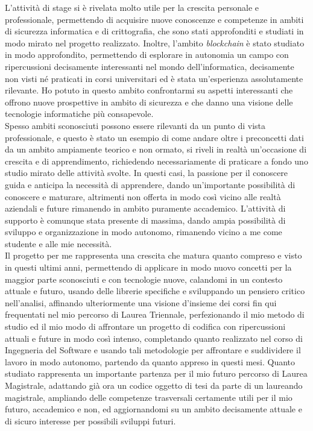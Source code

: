 L'attività di stage si è rivelata molto utile per la crescita personale e professionale, permettendo di acquisire nuove conoscenze
e competenze in ambiti di sicurezza informatica e di crittografia, che sono stati approfonditi e studiati in modo mirato nel progetto realizzato.
Inoltre, l'ambito \textit{blockchain} è stato studiato in modo approfondito, permettendo di esplorare in autonomia un campo con ripercussioni
decisamente interessanti nel mondo dell'informatica, decisamente non visti né praticati in corsi universitari ed è stata un'esperienza assolutamente rilevante. 
Ho potuto in questo ambito confrontarmi su aspetti interessanti che offrono nuove prospettive in ambito di sicurezza e che danno una visione delle tecnologie informatiche più consapevole. \\

Spesso ambiti sconosciuti possono essere rilevanti da un punto di vista professionale, e questo è stato un esempio di come
andare oltre i preconcetti dati da un ambito ampiamente teorico e non ormato, si riveli in realtà un'occasione di crescita
e di apprendimento, richiedendo necessariamente di praticare a fondo uno studio mirato delle attività svolte. 
In questi casi, la passione per il conoscere guida e anticipa la necessità di apprendere, dando un'importante possibilità di conoscere e maturare,
altrimenti non offerta in modo così vicino alle realtà aziendali e future rimanendo in ambito puramente accademico.
L'attività di supporto è comunque stata presente di massima, dando ampia possibilità di sviluppo e organizzazione in modo autonomo, 
rimanendo vicino a me come studente e alle mie necessità. \\

Il progetto per me rappresenta una crescita che matura quanto compreso e visto in questi ultimi anni, permettendo di applicare in modo nuovo 
concetti per la maggior parte sconosciuti e con tecnologie nuove, calandomi in un contesto attuale e futuro, usando delle librerie specifiche e sviluppando un
pensiero critico nell'analisi, affinando ulteriormente una visione d'insieme dei corsi fin qui frequentati nel mio percorso di Laurea Triennale, perfezionando il mio metodo di studio 
ed il mio modo di affrontare un progetto di codifica con ripercussioni attuali e future in modo così intenso, completando quanto realizzato nel corso di Ingegneria del Software
e usando tali metodologie per affrontare e suddividere il lavoro in modo autonomo, partendo da quanto appreso in questi mesi.
Quanto studiato rappresenta un importante partenza per il mio futuro percorso di Laurea Magistrale, adattando già ora un codice oggetto di tesi da parte di un laureando magistrale,
ampliando delle competenze trasversali certamente utili per il mio futuro, accademico e non, ed aggiornandomi su un ambito decisamente attuale e di sicuro interesse per possibili sviluppi futuri.